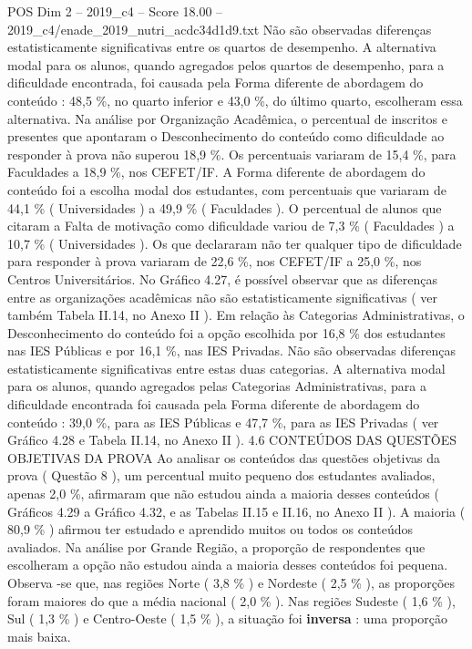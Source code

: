 \begin{textsample}{POS Dim 2 – 2019\_c4 – Score 18.00 – 2019\_c4/enade\_2019\_nutri\_acdc34d1d9.txt}
Não são observadas diferenças estatisticamente significativas entre os quartos de desempenho.
A alternativa modal para os alunos, quando agregados pelos quartos de desempenho, para a dificuldade encontrada, foi causada pela Forma diferente de abordagem do conteúdo : 48,5 \%, no quarto inferior e 43,0 \%, do último quarto, escolheram essa alternativa.
Na análise por Organização Acadêmica, o percentual de inscritos e presentes que apontaram o Desconhecimento do conteúdo como dificuldade ao responder à prova não superou 18,9 \%.
Os percentuais variaram de 15,4 \%, para Faculdades a 18,9 \%, nos CEFET/IF.
A Forma diferente de abordagem do conteúdo foi a escolha modal dos estudantes, com percentuais que variaram de 44,1 \% ( Universidades ) a 49,9 \% ( Faculdades ).
O percentual de alunos que citaram a Falta de motivação como dificuldade variou de 7,3 \% ( Faculdades ) a 10,7 \% ( Universidades ).
Os que declararam não ter qualquer tipo de dificuldade para responder à prova variaram de 22,6 \%, nos CEFET/IF a 25,0 \%, nos Centros Universitários.
No Gráfico 4.27, é possível observar que as diferenças entre as organizações acadêmicas não são estatisticamente significativas ( ver também Tabela II.14, no Anexo II ).
Em relação às Categorias Administrativas, o Desconhecimento do conteúdo foi a opção escolhida por 16,8 \% dos estudantes nas IES Públicas e por 16,1 \%, nas IES Privadas.
Não são observadas diferenças estatisticamente significativas entre estas duas categorias.
A alternativa modal para os alunos, quando agregados pelas Categorias Administrativas, para a dificuldade encontrada foi causada pela Forma diferente de abordagem do conteúdo : 39,0 \%, para as IES Públicas e 47,7 \%, para as IES Privadas ( ver Gráfico 4.28 e Tabela II.14, no Anexo II ). 4.6 CONTEÚDOS DAS QUESTÕES OBJETIVAS DA PROVA Ao analisar os conteúdos das questões objetivas da prova ( Questão 8 ), um percentual muito pequeno dos estudantes avaliados, apenas 2,0 \%, afirmaram que não estudou ainda a maioria desses conteúdos ( Gráficos 4.29 a Gráfico 4.32, e as Tabelas II.15 e II.16, no Anexo II ).
A maioria ( 80,9 \% ) afirmou ter estudado e aprendido muitos ou todos os conteúdos avaliados.
Na análise por Grande Região, a proporção de respondentes que escolheram a opção não estudou ainda a maioria desses conteúdos foi pequena.
Observa -se que, nas regiões Norte ( 3,8 \% ) e Nordeste ( 2,5 \% ), as proporções foram maiores do que a média nacional ( 2,0 \% ).
Nas regiões Sudeste ( 1,6 \% ), Sul ( 1,3 \% ) e Centro-Oeste ( 1,5 \% ), a situação foi \textbf{inversa} : uma proporção mais baixa.

\end{textsample}

